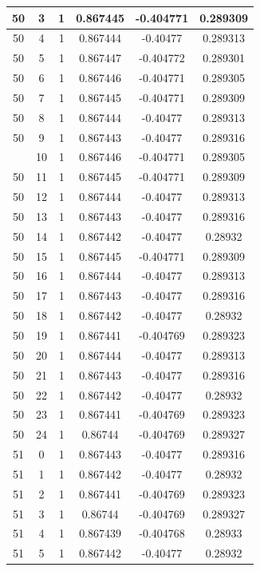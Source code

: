 \documentclass[12pt,a4paper]{article}
\numberwithin{equation}{section}
\numberwithin{figure}{section}
\numberwithin{table}{section}
\begin{document}
\begin{longtable}{|c|c|c|c|c|c|}
50 & 3 & 1 & 0.867445 & -0.404771 & 0.289309 \\ \hline
50 & 4 & 1 & 0.867444 & -0.40477 & 0.289313 \\ \hline
50 & 5 & 1 & 0.867447 & -0.404772 & 0.289301 \\ \hline
50 & 6 & 1 & 0.867446 & -0.404771 & 0.289305 \\ \hline
50 & 7 & 1 & 0.867445 & -0.404771 & 0.289309 \\ \hline
50 & 8 & 1 & 0.867444 & -0.40477 & 0.289313 \\ \hline
50 & 9 & 1 & 0.867443 & -0.40477 & 0.289316 \\ \hline
\pagebreak
50 & 10 & 1 & 0.867446 & -0.404771 & 0.289305 \\ \hline
50 & 11 & 1 & 0.867445 & -0.404771 & 0.289309 \\ \hline
50 & 12 & 1 & 0.867444 & -0.40477 & 0.289313 \\ \hline
50 & 13 & 1 & 0.867443 & -0.40477 & 0.289316 \\ \hline
50 & 14 & 1 & 0.867442 & -0.40477 & 0.28932 \\ \hline
50 & 15 & 1 & 0.867445 & -0.404771 & 0.289309 \\ \hline
50 & 16 & 1 & 0.867444 & -0.40477 & 0.289313 \\ \hline
50 & 17 & 1 & 0.867443 & -0.40477 & 0.289316 \\ \hline
50 & 18 & 1 & 0.867442 & -0.40477 & 0.28932 \\ \hline
50 & 19 & 1 & 0.867441 & -0.404769 & 0.289323 \\ \hline
50 & 20 & 1 & 0.867444 & -0.40477 & 0.289313 \\ \hline
50 & 21 & 1 & 0.867443 & -0.40477 & 0.289316 \\ \hline
50 & 22 & 1 & 0.867442 & -0.40477 & 0.28932 \\ \hline
50 & 23 & 1 & 0.867441 & -0.404769 & 0.289323 \\ \hline
50 & 24 & 1 & 0.86744 & -0.404769 & 0.289327 \\ \hline
51 & 0 & 1 & 0.867443 & -0.40477 & 0.289316 \\ \hline
51 & 1 & 1 & 0.867442 & -0.40477 & 0.28932 \\ \hline
51 & 2 & 1 & 0.867441 & -0.404769 & 0.289323 \\ \hline
51 & 3 & 1 & 0.86744 & -0.404769 & 0.289327 \\ \hline
51 & 4 & 1 & 0.867439 & -0.404768 & 0.28933 \\ \hline
51 & 5 & 1 & 0.867442 & -0.40477 & 0.28932 \\ \hline

\end{longtable}
\end{document}

